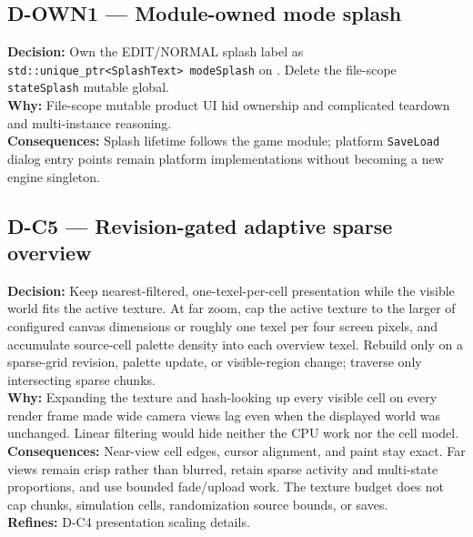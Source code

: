 \subsection*{D-OWN1 --- Module-owned mode splash}
\begin{decisionbox}[title={D-OWN1 \quad 2026-08-06}]
\textbf{Decision:} Own the EDIT/NORMAL splash label as
\texttt{std::unique\_ptr<SplashText> modeSplash} on
. Delete the file-scope \texttt{stateSplash}
mutable global.\\
\textbf{Why:} File-scope mutable product UI hid ownership and complicated
teardown and multi-instance reasoning.\\
\textbf{Consequences:} Splash lifetime follows the game module; platform
\texttt{SaveLoad} dialog entry points remain platform implementations without
becoming a new engine singleton.
\end{decisionbox}

\subsection*{D-C5 --- Revision-gated adaptive sparse overview}
\begin{decisionbox}[title={D-C5 \quad 2026-08-07}]
\textbf{Decision:} Keep nearest-filtered, one-texel-per-cell presentation while
the visible world fits the active texture. At far zoom, cap the active texture
to the larger of configured canvas dimensions or roughly one texel per four
screen pixels, and accumulate source-cell palette density into each overview
texel. Rebuild only on a sparse-grid revision, palette update, or visible-region
change; traverse only intersecting sparse chunks.\\
\textbf{Why:} Expanding the texture and hash-looking up every visible cell on
every render frame made wide camera views lag even when the displayed world was
unchanged. Linear filtering would hide neither the CPU work nor the cell model.\\
\textbf{Consequences:} Near-view cell edges, cursor alignment, and paint stay
exact. Far views remain crisp rather than blurred, retain sparse activity and
multi-state proportions, and use bounded fade/upload work. The texture budget
does not cap chunks, simulation cells, randomization source bounds, or saves.\\
\textbf{Refines:} D-C4 presentation scaling details.
\end{decisionbox}

